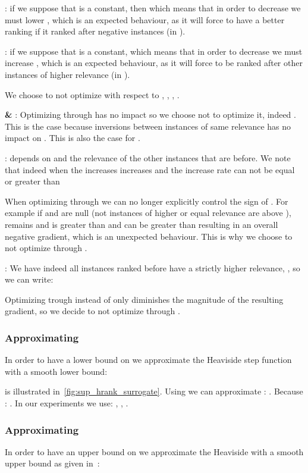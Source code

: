 \medbreak
\textbf{}: if we suppose that  is a constant, then  which means that in order to decrease  we must lower , which is an expected behaviour, as it will force  to have a better ranking if it ranked after negative instances (in ).

\medbreak
\textbf{}: if we suppose that  is a constant,  which means that in order to decrease  we must increase , which is an expected behaviour, as it will force  to be ranked after other instances of higher relevance (in ).

\medbreak
We choose to not optimize with respect to , , , .


\medbreak

\textbf{ \& }: Optimizing through  has no impact so we choose not to optimize it, indeed . This is the case because inversions between instances of same relevance has no impact on . This is also the case for .


\medbreak

\textbf{}:  depends on  and the relevance of the other instances that are before. We note that  indeed when the  increases  increases and the increase rate can not be equal or greater than 



When optimizing through  we can no longer explicitly control the sign of . For example if  and  are null (\ie not instances of higher or equal relevance are above ),  remains and is greater than  and  can be greater than  resulting in an overall negative gradient, which is an unexpected behaviour. This is why we choose to not optimize through .


\medbreak

\textbf{}: We have  indeed all instances  ranked before  have a strictly higher relevance, \ie , so we can write:




Optimizing trough  instead of only  diminishes the magnitude of the resulting gradient, so we decide to not optimize through . 


\subsubsection{Approximating } In order to have a lower bound on  we approximate the Heaviside step function  with a smooth lower bound:


 is illustrated in~\cref{fig:sup_hrank_surrogate}. Using  we can approximate : . Because : . In our experiments we use: , , .

\subsubsection{Approximating } In order to have an upper bound on  we approximate the Heaviside with a smooth upper bound as given in~\cite{ramzi2021robust}:


